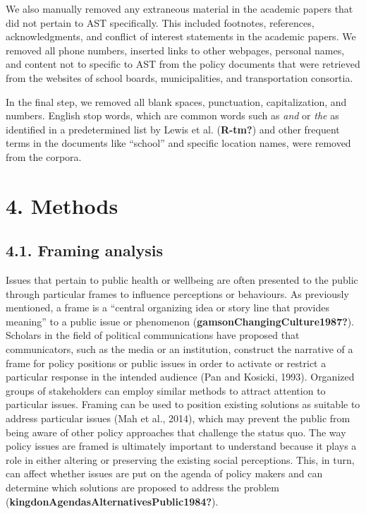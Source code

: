 \documentclass[]{elsarticle} %
\begin{document}
We also manually removed any extraneous material in the academic papers
that did not pertain to AST specifically. This included footnotes,
references, acknowledgments, and conflict of interest statements in the
academic papers. We removed all phone numbers, inserted links to other
webpages, personal names, and content not to specific to AST from the
policy documents that were retrieved from the websites of school boards,
municipalities, and transportation consortia.

In the final step, we removed all blank spaces, punctuation,
capitalization, and numbers. English stop words, which are common words
such as \emph{and} or \emph{the} as identified in a predetermined list
by Lewis et al. (\textbf{R-tm?}) and other frequent terms in the
documents like ``school'' and specific location names, were removed from
the corpora.

\hypertarget{methods}{%
\section{4. Methods}\label{methods}}

\hypertarget{framing-analysis}{%
\subsection{4.1. Framing analysis}\label{framing-analysis}}

Issues that pertain to public health or wellbeing are often presented to
the public through particular frames to influence perceptions or
behaviours. As previously mentioned, a frame is a ``central organizing
idea or story line that provides meaning'' to a public issue or
phenomenon (\textbf{gamsonChangingCulture1987?}). Scholars in the field
of political communications have proposed that communicators, such as
the media or an institution, construct the narrative of a frame for
policy positions or public issues in order to activate or restrict a
particular response in the intended audience (Pan and Kosicki, 1993).
Organized groups of stakeholders can employ similar methods to attract
attention to particular issues. Framing can be used to position existing
solutions as suitable to address particular issues (Mah et al., 2014),
which may prevent the public from being aware of other policy approaches
that challenge the status quo. The way policy issues are framed is
ultimately important to understand because it plays a role in either
altering or preserving the existing social perceptions. This, in turn,
can affect whether issues are put on the agenda of policy makers and can
determine which solutions are proposed to address the problem
(\textbf{kingdonAgendasAlternativesPublic1984?}).
\end{document}
